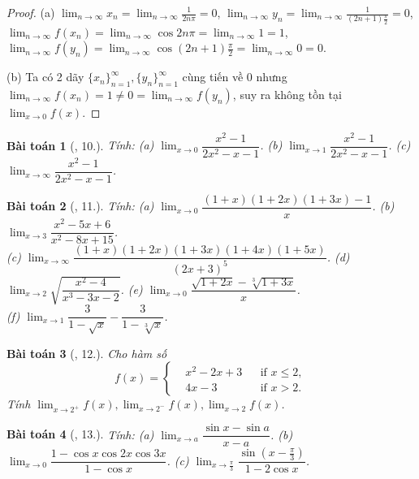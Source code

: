 \documentclass{article}
\newtheorem{baitoan}{Bài toán}
\begin{document}
\begin{proof}
	(a) $\lim_{n\to\infty} x_n = \lim_{n\to\infty} \frac{1}{2n\pi} = 0$, $\lim_{n\to\infty} y_n = \lim_{n\to\infty} \frac{1}{(2n + 1)\frac{\pi}{2}} = 0$, $\lim_{n\to\infty} f(x_n) = \lim_{n\to\infty} \cos2n\pi = \lim_{n\to\infty} 1 = 1$, $\lim_{n\to\infty} f(y_n) = \lim_{n\to\infty} \cos(2n + 1)\frac{\pi}{2} = \lim_{n\to\infty} 0 = 0$.
	
	\item(b) Ta có 2 dãy $\{x_n\}_{n=1}^\infty,\{y_n\}_{n=1}^\infty$ cùng tiến về 0 nhưng $\lim_{n\to\infty} f(x_n) = 1\ne0 = \lim_{n\to\infty} f(y_n)$, suy ra không tồn tại $\lim_{x\to0} f(x)$.
\end{proof}

\begin{baitoan}[\cite{TLCT_dai_so_giai_tich_11}, 10.]
	Tính: (a) $\lim_{x\to0} \dfrac{x^2 - 1}{2x^2 - x - 1}$. (b) $\lim_{x\to1} \dfrac{x^2 - 1}{2x^2 - x - 1}$. (c) $\lim_{x\to\infty} \dfrac{x^2 - 1}{2x^2 - x - 1}$.
\end{baitoan}

\begin{baitoan}[\cite{TLCT_dai_so_giai_tich_11}, 11.]
	Tính: (a) $\lim_{x\to0} \dfrac{(1 + x)(1 + 2x)(1 + 3x) - 1}{x}$. (b) $\lim_{x\to3} \dfrac{x^2 - 5x + 6}{x^2 - 8x + 15}$.\\(c) $\lim_{x\to\infty} \dfrac{(1 + x)(1 + 2x)(1 + 3x)(1 + 4x)(1 + 5x)}{(2x + 3)^5}$. (d) $\lim_{x\to2} \sqrt{\dfrac{x^2 - 4}{x^3 - 3x - 2}}$. (e) $\lim_{x\to0} \dfrac{\sqrt{1 + 2x} - \sqrt[3]{1 + 3x}}{x}$.\\(f) $\lim_{x\to1} \dfrac{3}{1 - \sqrt{x}} - \dfrac{3}{1 - \sqrt[3]{x}}$.
\end{baitoan}

\begin{baitoan}[\cite{TLCT_dai_so_giai_tich_11}, 12.]
	Cho hàm số
	\begin{equation*}
		f(x) = \left\{\begin{split}
			&x^2 - 2x + 3&&\mbox{if } x\le2,\\
			&4x - 3&&\mbox{if } x > 2.
		\end{split}\right.
	\end{equation*}
	Tính $\lim_{x\to2^+} f(x),\lim_{x\to2^-} f(x),\lim_{x\to2} f(x)$.
\end{baitoan}

\begin{baitoan}[\cite{TLCT_dai_so_giai_tich_11}, 13.]
	Tính: (a) $\lim_{x\to a} \dfrac{\sin x - \sin a}{x - a}$. (b) $\lim_{x\to0} \dfrac{1 - \cos x\cos2x\cos3x}{1 - \cos x}$. (c) $\lim_{x\to\frac{\pi}{3}} \dfrac{\sin\left(x - \frac{\pi}{3}\right)}{1 - 2\cos x}$.
\end{baitoan}
\end{document}
